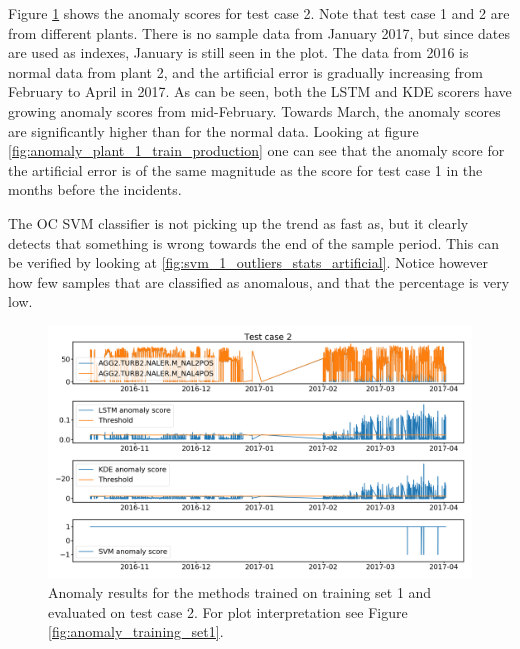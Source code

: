         Figure \ref{fig:anomaly_plant_1_train_artificial} shows the anomaly scores for test case 2. Note that test case 1 and 2 are from different plants. There is no sample data from January 2017, but since dates are used as indexes, January is still seen in the plot. The data from 2016 is normal data from plant 2, and the artificial error is gradually increasing from February to April in 2017. As can be seen, both the LSTM and KDE scorers have growing anomaly scores from mid-February. Towards March, the anomaly scores are significantly higher than for the normal data. Looking at figure \ref{fig:anomaly_plant_1_train_production} one can see that the anomaly score for the artificial error is of the same magnitude as the score for test case 1 in the months before the incidents. 
        
        The OC SVM classifier is not picking up the trend as fast as, but it clearly detects that something is wrong towards the end of the sample period. This can be verified by looking at \ref{fig:svm_1_outliers_stats_artificial}. Notice however how few samples that are classified as anomalous, and that the percentage is very low.      
        \begin{figure}
            \centering
            \includegraphics[width = \textwidth]{report/figures/analysis/plant1_training/artificial_data_anomaly.png}
            \caption{Anomaly results for the methods trained on training set 1 and evaluated on test case 2. For plot interpretation see Figure \ref{fig:anomaly_training_set1}.}
            \label{fig:anomaly_plant_1_train_artificial}
        \end{figure}
    
